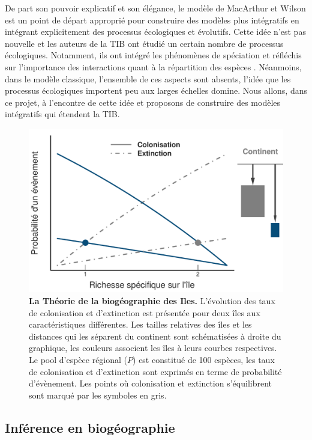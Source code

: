 De part son pouvoir explicatif et son élégance, le modèle de MacArthur
et Wilson est un point de départ approprié pour construire des modèles
plus intégratifs en intégrant explicitement des processus écologiques et
évolutifs. Cette idée n'est pas nouvelle et les auteurs de la TIB ont
étudié un certain nombre de processus écologiques. Notamment, ils ont
intégré les phénomènes de spéciation \cite{MacArthur1967} et réfléchis
sur l'importance des interactions quant à la répartition des espèces
\cite{MacArthur1984}. Néanmoins, dans le modèle classique, l'ensemble de
ces aspects sont absents, l'idée que les processus écologiques importent
peu aux larges échelles domine. Nous allons, dans ce projet, à
l'encontre de cette idée et proposons de construire des modèles
intégratifs qui étendent la TIB.

\begin{figure}[htbp]
\centering
\includegraphics{fig/fig1.pdf}
\caption{\textbf{La Théorie de la biogéographie des Iles.} L'évolution
des taux de colonisation et d'extinction est présentée pour deux îles
aux caractéristiques différentes. Les tailles relatives des îles et les
distances qui les séparent du continent sont schématisées à droite du
graphique, les couleurs associent les îles à leurs courbes respectives.
Le pool d'espèce régional (\(P\)) est constitué de 100 espèces, les taux
de colonisation et d'extinction sont exprimés en terme de probabilité
d'évènement. Les points où colonisation et extinction s'équilibrent sont
marqué par les symboles en gris.\label{fig:figMW}}
\end{figure}

\subsection{Inférence en biogéographie}

